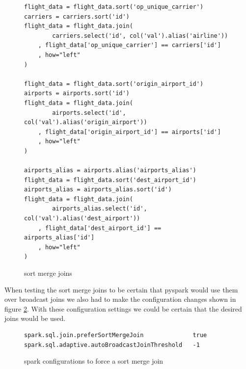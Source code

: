 \begin{figure}[H]
\centering
\begin{lstlisting}
flight_data = flight_data.sort('op_unique_carrier')
carriers = carriers.sort('id')
flight_data = flight_data.join(
		carriers.select('id', col('val').alias('airline'))
	, flight_data['op_unique_carrier'] == carriers['id']
	, how="left"
)

flight_data = flight_data.sort('origin_airport_id')
airports = airports.sort('id')
flight_data = flight_data.join(
		airports.select('id', col('val').alias('origin_airport'))
	, flight_data['origin_airport_id'] == airports['id']
	, how="left"
)

airports_alias = airports.alias('airports_alias')
flight_data = flight_data.sort('dest_airport_id')
airports_alias = airports_alias.sort('id')
flight_data = flight_data.join(
		airports_alias.select('id', col('val').alias('dest_airport'))
	, flight_data['dest_airport_id'] == airports_alias['id']
	, how="left"
)
\end{lstlisting}
\caption{sort merge joins}
\label{fig:sortmergejoins}
\end{figure}

When testing the sort merge joins to be certain that pyspark would use them over broadcast joins we also had to make the configuration changes shown in figure \ref{fig:sortmergeconfig}. With these configuration settings we could be certain that the desired joins would be used.

\begin{figure}[H]
\centering
\begin{lstlisting}
spark.sql.join.preferSortMergeJoin              true
spark.sql.adaptive.autoBroadcastJoinThreshold   -1
\end{lstlisting}
\caption{spark configurations to force a sort merge join}
\label{fig:sortmergeconfig}
\end{figure}

